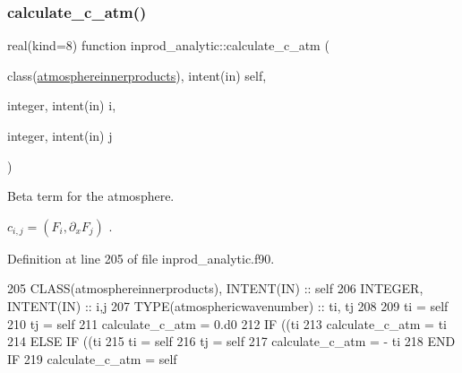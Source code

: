 \subsubsection{\texorpdfstring{calculate\+\_\+c\+\_\+atm()}{calculate\_c\_atm()}}
{\footnotesize\ttfamily real(kind=8) function inprod\+\_\+analytic\+::calculate\+\_\+c\+\_\+atm (\begin{DoxyParamCaption}\item[{class(\hyperlink{structinprod__analytic_1_1atmosphereinnerproducts}{atmosphereinnerproducts}), intent(in)}]{self,  }\item[{integer, intent(in)}]{i,  }\item[{integer, intent(in)}]{j }\end{DoxyParamCaption})\hspace{0.3cm}{\ttfamily [private]}}



Beta term for the atmosphere. 

$ c_{i,j} = (F_i, \partial_x F_j)$ . 

Definition at line 205 of file inprod\+\_\+analytic.\+f90.


\begin{DoxyCode}
205     \textcolor{keywordtype}{CLASS}(atmosphereinnerproducts), \textcolor{keywordtype}{INTENT(IN)} :: self
206     \textcolor{keywordtype}{INTEGER}, \textcolor{keywordtype}{INTENT(IN)} :: i,j
207     \textcolor{keywordtype}{TYPE}(atmosphericwavenumber) :: ti, tj
208 
209     ti = self%
210     tj = self%
211     calculate\_c\_atm = 0.d0
212     \textcolor{keywordflow}{IF} ((ti%
213       calculate\_c\_atm = ti%
214     \textcolor{keywordflow}{ELSE} \textcolor{keywordflow}{IF} ((ti%
215       ti = self%
216       tj = self%
217       calculate\_c\_atm = - ti%
218 \textcolor{keywordflow}{    END IF}
219     calculate\_c\_atm = self%
\end{DoxyCode}
\mbox{\label{namespaceinprod__analytic_a4040642a04e9a16f23b51fcff998c513}} 

